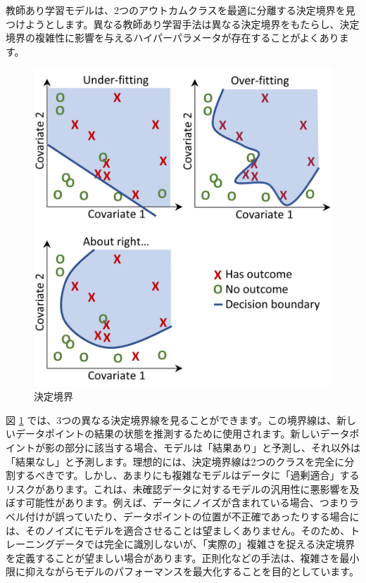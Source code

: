 \documentclass[
  11pt]{book}
\theoremstyle{definition}
\theoremstyle{definition}
\theoremstyle{definition}
\theoremstyle{definition}
\theoremstyle{remark}
\begin{document}
教師あり学習モデルは、2つのアウトカムクラスを最適に分離する決定境界を見つけようとします。異なる教師あり学習手法は異なる決定境界をもたらし、決定境界の複雑性に影響を与えるハイパーパラメータが存在することがよくあります。 

\begin{figure}

{\centering \includegraphics[width=0.8\linewidth]{images/PatientLevelPrediction/decisionBoundary} 

}

\caption{決定境界}\label{fig:decisionBoundary}
\end{figure}

図 \ref{fig:decisionBoundary} では、3つの異なる決定境界線を見ることができます。この境界線は、新しいデータポイントの結果の状態を推測するために使用されます。新しいデータポイントが影の部分に該当する場合、モデルは「結果あり」と予測し、それ以外は「結果なし」と予測します。理想的には、決定境界線は2つのクラスを完全に分割するべきです。しかし、あまりにも複雑なモデルはデータに「過剰適合」するリスクがあります。これは、未確認データに対するモデルの汎用性に悪影響を及ぼす可能性があります。例えば、データにノイズが含まれている場合、つまりラベル付けが誤っていたり、データポイントの位置が不正確であったりする場合には、そのノイズにモデルを適合させることは望ましくありません。そのため、トレーニングデータでは完全に識別しないが、「実際の」複雑さを捉える決定境界を定義することが望ましい場合があります。正則化などの手法は、複雑さを最小限に抑えながらモデルのパフォーマンスを最大化することを目的としています。
\end{document}

